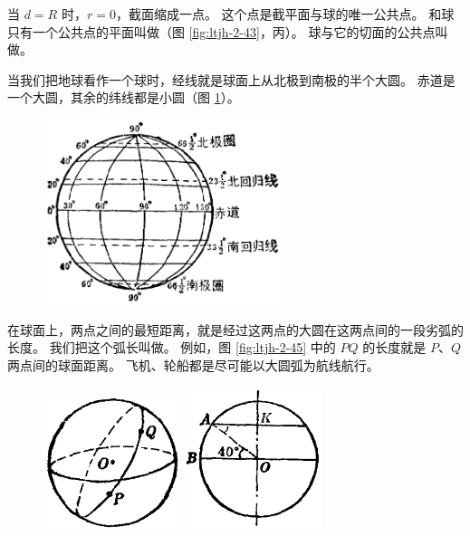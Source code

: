 当 $d = R$ 时，$r = 0$，截面缩成一点。 这个点是截平面与球的唯一公共点。
和球只有一个公共点的平面叫做（图 \ref{fig:ltjh-2-43}，丙）。
球与它的切面的公共点叫做。

当我们把地球看作一个球时，经线就是球面上从北极到南极的半个大圆。
赤道是一个大圆，其余的纬线都是小圆（图 \ref{fig:ltjh-2-44}）。

\begin{figure}[htbp]
    \centering
    \includegraphics[width=7cm]{../pic/ltjh-ch2-44.png}
    \caption{}\label{fig:ltjh-2-44}
\end{figure}

在球面上，两点之间的最短距离，就是经过这两点的大圆在这两点间的一段劣弧的长度。
我们把这个弧长叫做。
例如，图 \ref{fig:ltjh-2-45} 中的 $PQ$ 的长度就是 $P$、$Q$ 两点间的球面距离。
飞机、轮船都是尽可能以大圆弧为航线航行。

\begin{figure}[htbp]
    \centering
    \begin{minipage}[b]{7cm}
        \centering
        \includegraphics[width=4cm]{../pic/ltjh-ch2-45.png}
        \caption{}\label{fig:ltjh-2-45}
    \end{minipage}
    \qquad
    \begin{minipage}[b]{7cm}
        \centering
        \includegraphics[width=4cm]{../pic/ltjh-ch2-46.png}
        \caption{}\label{fig:ltjh-2-46}
    \end{minipage}
\end{figure}

